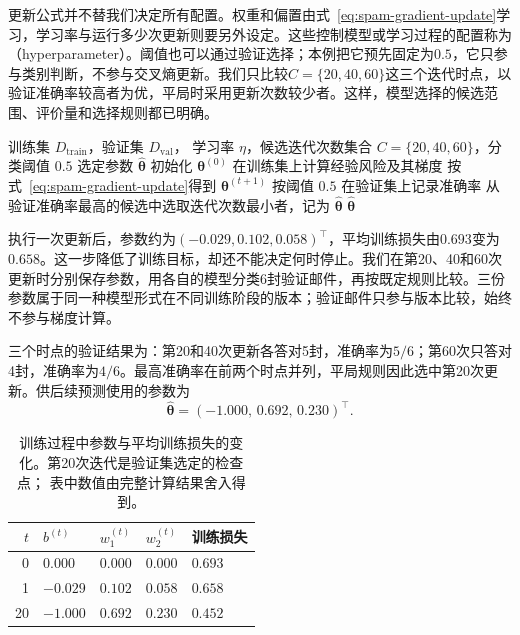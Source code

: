 更新公式并不替我们决定所有配置。权重和偏置由式~\eqref{eq:spam-gradient-update}学习，学习率与运行多少次更新则要另外设定。这些控制模型或学习过程的配置称为（hyperparameter）。阈值也可以通过验证选择；本例把它预先固定为$0.5$，它只参与类别判断，不参与交叉熵更新。我们只比较$C=\{20,40,60\}$这三个迭代时点，以验证准确率较高者为优，平局时采用更新次数较少者。这样，模型选择的候选范围、评价量和选择规则都已明确。

\begin{algorithm}[垃圾邮件分类器的训练]
  \label{alg:spam-training}
  \begin{algorithmic}[1]
    \Require 训练集 $D_{\mathrm{train}}$，验证集 $D_{\mathrm{val}}$，
      学习率 $\eta$，候选迭代次数集合 $C=\{20,40,60\}$，分类阈值 $0.5$
    \Ensure 选定参数 $\hat{\bm{\theta}}$
    \State 初始化 $\bm{\theta}^{(0)}$
      \State 在训练集上计算经验风险及其梯度
      \State 按式~\eqref{eq:spam-gradient-update}得到 $\bm{\theta}^{(t+1)}$
        \State 按阈值 $0.5$ 在验证集上记录准确率
      \EndIf
    \EndFor
    \State 从验证准确率最高的候选中选取迭代次数最小者，记为 $\hat{\bm{\theta}}$
    \State \Return $\hat{\bm{\theta}}$
  \end{algorithmic}
\end{algorithm}

执行一次更新后，参数约为$(-0.029,0.102,0.058)^{\top}$，平均训练损失由$0.693$变为$0.658$。这一步降低了训练目标，却还不能决定何时停止。我们在第20、40和60次更新时分别保存参数，用各自的模型分类6封验证邮件，再按既定规则比较。三份参数属于同一种模型形式在不同训练阶段的版本；验证邮件只参与版本比较，始终不参与梯度计算。

三个时点的验证结果为：第20和40次更新各答对5封，准确率为$5/6$；第60次只答对4封，准确率为$4/6$。最高准确率在前两个时点并列，平局规则因此选中第20次更新。供后续预测使用的参数为
\begin{equation}
  \hat{\bm{\theta}}=(-1.000,\,0.692,\,0.230)^{\top}.
  \label{eq:spam-fitted-parameters}
\end{equation}

\begin{table}[htbp]
  \centering
  \small
  \begin{tabularx}{\linewidth}{@{}rXXXX@{}}
    \toprule
    $t$ & $b^{(t)}$ & $w_1^{(t)}$ & $w_2^{(t)}$ & 训练损失 \\
    \midrule
    0  & $0.000$  & $0.000$ & $0.000$ & $0.693$ \\
    1  & $-0.029$ & $0.102$ & $0.058$ & $0.658$ \\
    20 & $-1.000$ & $0.692$ & $0.230$ & $0.452$ \\
    \bottomrule
  \end{tabularx}
  \caption{训练过程中参数与平均训练损失的变化。第20次迭代是验证集选定的检查点；
  表中数值由完整计算结果舍入得到。}
  \label{tab:spam-training-record}
\end{table}


